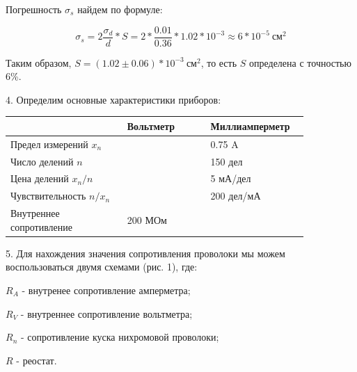 \documentclass[14pt]{article}
\begin{document}
	Погрешность $\sigma_s$ найдем по формуле:
	
	$$\sigma_s = 2\frac{\sigma_d}{d}*S = 2*\frac{0.01}{0.36}*1.02*10^{-3} \approx 6*10^{-5}~\text{см}^2$$
	
	Таким образом, $S = (1.02 \pm 0.06)*10^{-3}~\text{см}^2$, то есть $S$ определена с точностью 6\%.
	
	\vspace{0.5cm}
	4. Определим основные характеристики приборов:
	
	\begin{center}
	\begin{tabular}{|p{0.35\linewidth}|p{0.25\linewidth}|p{0.25\linewidth}|}
	\hline
								& Вольтметр 		& Миллиамперметр\\
	\hline
	Предел измерений $x_n$ 		& 					& 0.75 A\\
	\hline
	Число делений $n$			& 					& 150 дел\\
	\hline
	Цена делений $x_n/n$		&					& 5 мА/дел\\
	\hline
	Чувствительность $n/x_n$	&					& 200 дел/мА\\
	\hline
	Внутреннее сопротивление	& 200 МОм			& ~\\	
	\hline	
	\end{tabular}
	\end{center}

	\vspace{1cm}
	5. Для нахождения значения сопротивления проволоки мы можем воспользоваться двумя схемами (рис. 1), где:
	
	\vspace*{0.3cm}
	$R_A$ - внутренее сопротивление амперметра;
	
	$R_V$ - внутреннее сопротивление вольтметра;
	
	$R_n$ - сопротивление куска нихромовой проволоки;
	
	$R$ - реостат.
\end{document}
